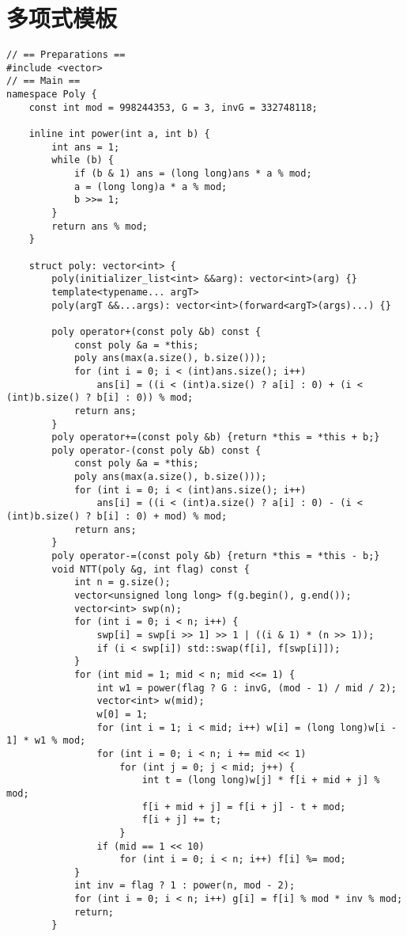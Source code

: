 \section{多项式模板}

\begin{verbatim}
// == Preparations ==
#include <vector>
// == Main ==
namespace Poly {
    const int mod = 998244353, G = 3, invG = 332748118;

    inline int power(int a, int b) {
        int ans = 1;
        while (b) {
            if (b & 1) ans = (long long)ans * a % mod;
            a = (long long)a * a % mod;
            b >>= 1;
        }
        return ans % mod;
    }

    struct poly: vector<int> {
        poly(initializer_list<int> &&arg): vector<int>(arg) {}
        template<typename... argT>
        poly(argT &&...args): vector<int>(forward<argT>(args)...) {}

        poly operator+(const poly &b) const {
            const poly &a = *this;
            poly ans(max(a.size(), b.size()));
            for (int i = 0; i < (int)ans.size(); i++)
                ans[i] = ((i < (int)a.size() ? a[i] : 0) + (i < (int)b.size() ? b[i] : 0)) % mod;
            return ans;
        }
        poly operator+=(const poly &b) {return *this = *this + b;}
        poly operator-(const poly &b) const {
            const poly &a = *this;
            poly ans(max(a.size(), b.size()));
            for (int i = 0; i < (int)ans.size(); i++)
                ans[i] = ((i < (int)a.size() ? a[i] : 0) - (i < (int)b.size() ? b[i] : 0) + mod) % mod;
            return ans;
        }
        poly operator-=(const poly &b) {return *this = *this - b;}
        void NTT(poly &g, int flag) const {
            int n = g.size();
            vector<unsigned long long> f(g.begin(), g.end());
            vector<int> swp(n);
            for (int i = 0; i < n; i++) {
                swp[i] = swp[i >> 1] >> 1 | ((i & 1) * (n >> 1));
                if (i < swp[i]) std::swap(f[i], f[swp[i]]);
            }
            for (int mid = 1; mid < n; mid <<= 1) {
                int w1 = power(flag ? G : invG, (mod - 1) / mid / 2);
                vector<int> w(mid);
                w[0] = 1;
                for (int i = 1; i < mid; i++) w[i] = (long long)w[i - 1] * w1 % mod;
                for (int i = 0; i < n; i += mid << 1)
                    for (int j = 0; j < mid; j++) {
                        int t = (long long)w[j] * f[i + mid + j] % mod;
                        f[i + mid + j] = f[i + j] - t + mod;
                        f[i + j] += t;
                    }
                if (mid == 1 << 10)
                    for (int i = 0; i < n; i++) f[i] %= mod;
            }
            int inv = flag ? 1 : power(n, mod - 2);
            for (int i = 0; i < n; i++) g[i] = f[i] % mod * inv % mod;
            return;
        }


\end{verbatim}
